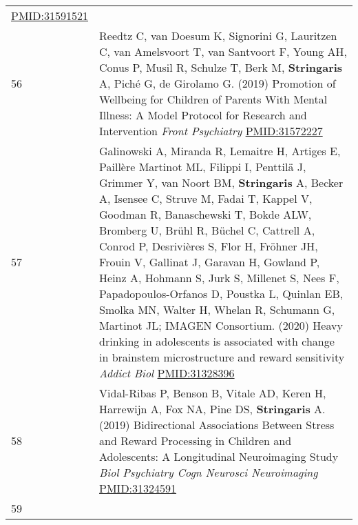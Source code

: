 \documentclass[
]{article}
\begin{document}
\begin{longtable}[]{@{}ll@{}}
\begin{minipage}[t]{0.94\columnwidth}
\url{PMID:31591521}\strut
\end{minipage}\tabularnewline
\begin{minipage}[t]{0.01\columnwidth}\raggedright
56\strut
\end{minipage} & \begin{minipage}[t]{0.94\columnwidth}\raggedright
Reedtz C, van Doesum K, Signorini G, Lauritzen C, van Amelsvoort T, van
Santvoort F, Young AH, Conus P, Musil R, Schulze T, Berk M,
\textbf{Stringaris} A, Piché G, de Girolamo G. (2019) Promotion of
Wellbeing for Children of Parents With Mental Illness: A Model Protocol
for Research and Intervention \emph{Front Psychiatry}
\url{PMID:31572227}\strut
\end{minipage}\tabularnewline
\begin{minipage}[t]{0.01\columnwidth}\raggedright
57\strut
\end{minipage} & \begin{minipage}[t]{0.94\columnwidth}\raggedright
Galinowski A, Miranda R, Lemaitre H, Artiges E, Paillère Martinot ML,
Filippi I, Penttilä J, Grimmer Y, van Noort BM, \textbf{Stringaris} A,
Becker A, Isensee C, Struve M, Fadai T, Kappel V, Goodman R,
Banaschewski T, Bokde ALW, Bromberg U, Brühl R, Büchel C, Cattrell A,
Conrod P, Desrivières S, Flor H, Fröhner JH, Frouin V, Gallinat J,
Garavan H, Gowland P, Heinz A, Hohmann S, Jurk S, Millenet S, Nees F,
Papadopoulos-Orfanos D, Poustka L, Quinlan EB, Smolka MN, Walter H,
Whelan R, Schumann G, Martinot JL; IMAGEN Consortium. (2020) Heavy
drinking in adolescents is associated with change in brainstem
microstructure and reward sensitivity \emph{Addict Biol}
\url{PMID:31328396}\strut
\end{minipage}\tabularnewline
\begin{minipage}[t]{0.01\columnwidth}\raggedright
58\strut
\end{minipage} & \begin{minipage}[t]{0.94\columnwidth}\raggedright
Vidal-Ribas P, Benson B, Vitale AD, Keren H, Harrewijn A, Fox NA, Pine
DS, \textbf{Stringaris} A. (2019) Bidirectional Associations Between
Stress and Reward Processing in Children and Adolescents: A Longitudinal
Neuroimaging Study \emph{Biol Psychiatry Cogn Neurosci Neuroimaging}
\url{PMID:31324591}\strut
\end{minipage}\tabularnewline
\begin{minipage}[t]{0.01\columnwidth}\raggedright
59\strut
\end{minipage} & \begin{minipage}[t]{0.94\columnwidth}\raggedright

\end{minipage}
\end{longtable}
\end{document}
